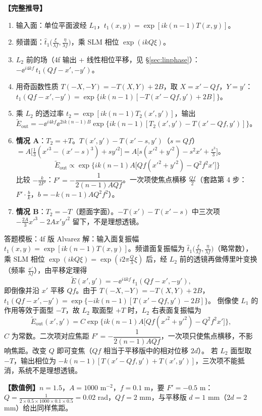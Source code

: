 \textbf{【完整推导】}
\begin{enumerate}
\item 输入面：单位平面波经 $L_1$，$t_1(x,y)=\exp[ik(n-1)T(x,y)]$。
\item 频谱面：$\hat t_1\big(\frac{\xi}{\lambda f},\frac{\eta}{\lambda f}\big)$，乘 SLM 相位 $\exp(ikQ\xi)$。
\item $L_2$ 前的场（4f 输出 + 线性相位平移，见 §\ref{sec:linphase}）：$-\ee^{i4kf}\,t_1(Qf-x',-y')$。
\item 用奇函数性质 $T(-X,-Y)=-T(X,Y)+2B$，取 $X=x'-Qf$，$Y=y'$：$t_1(Qf-x',-y')=\exp\{ik(n-1)[-T(x'-Qf,y')+2B]\}$。
\item 乘 $L_2$ 的透过率 $t_2=\exp[ik(n-1)T_2(x',y')]$，输出
$\tilde E_{\text{out}}=-\ee^{i4kf}\ee^{2ik(n-1)B}\exp\{ik(n-1)[T_2(x',y')-T(x'-Qf,y')]\}$。
\item \textbf{情况 A}：$T_2=+T$。$T(x',y')-T(x'-s,y')$（$s=Qf$）$=A\big[\frac13(x'^3-(x'-s)^3)+sy'^2\big]=A\big[s(x'^2+y'^2)-s^2x'+\frac{s^3}{3}\big]$。
\[
\tilde E_{\text{out}}\propto\exp\!\Big\{ik(n-1)A\big[Qf(x'^2+y'^2)-Q^2f^2x'\big]\Big\}
\]
比较 $-\frac{k}{2F'}$：$\boxed{F'=-\dfrac{1}{2(n-1)AQf}}$。一次项使焦点横移 $\frac{Qf}{2}$（套路第 4 步：$F'\cdot\frac{b}{k}$，$b=-k(n-1)AQ^2f^2$）。
\item \textbf{情况 B}：$T_2=-T$（题面字面）。$-T(x')-T(x'-s)$ 中三次项 $-\frac{2A}{3}x'^3-2Ax'y'^2$ 留下，不是理想透镜。
\end{enumerate}

\begin{exam}{答题模板：4f 版 Alvarez}
解：输入面复振幅 $t_1(x,y)=\exp[ik(n-1)T(x,y)]$。频谱面复振幅为 $\hat t_1\big(\frac{\xi}{\lambda f},\frac{\eta}{\lambda f}\big)$（略常数），乘 SLM 相位 $\exp(ikQ\xi)=\exp(i2\pi\frac{Q}{\lambda}\xi)$ 后，经 $L_2$ 前的透镜再做傅里叶变换（频率 $\frac{x'}{\lambda f}$），由平移定理得
\[
\tilde E(x',y')=-\ee^{i4kf}\,t_1(Qf-x',-y'),
\]
即倒像并沿 $x'$ 平移 $Qf$。由于 $T(-X,-Y)=-T(X,Y)+2B$，
$t_1(Qf-x',-y')=\exp\{-ik(n-1)[T(x'-Qf,y')-2B]\}$。
倒像使 $L_1$ 的作用等效于面型 $-T$，故 $L_2$ 取面型 $+T$ 时，$L_2$ 右表面复振幅为
\[
\tilde E_{\text{out}}(x',y')=C\exp\Big\{ik(n-1)A\big[Qf(x'^2+y'^2)-Q^2f^2x'\big]\Big\},
\]
$C$ 为常数。二次项对应焦距 $F'=-\dfrac{1}{2(n-1)AQf}$，一次项只使焦点横移，不影响焦距。改变 $Q$ 即可变焦（$Qf$ 相当于平移版中的相对位移 $2d$）。
若 $L_2$ 面型取 $-T$，输出相位为 $-k(n-1)[T(x'-Qf,y')+T(x',y')]$，三次项不能抵消，系统不是理想透镜。
\end{exam}

\textbf{【数值例】}$n=1.5$，$A=1000$ m$^{-2}$，$f=0.1$ m，要 $F'=-0.5$ m：$Q=\frac{1}{2\times0.5\times1000\times0.1\times0.5}=0.02$ rad，$Qf=2$ mm，与平移版 $d=1$ mm（$2d=2$ mm）给出同样焦距。

